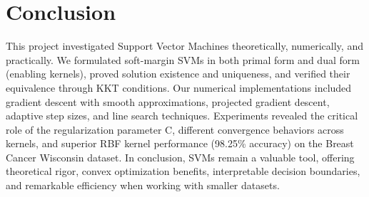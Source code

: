\section{Conclusion}
\label{chap:conclusion}
\vspace{-0.4cm}
This project investigated Support Vector Machines theoretically, numerically, and practically. We formulated soft-margin SVMs in both primal form and dual form (enabling kernels), proved solution existence and uniqueness, and verified their equivalence through KKT conditions. Our numerical implementations included gradient descent with smooth approximations, projected gradient descent, adaptive step sizes, and line search techniques. Experiments revealed the critical role of the regularization parameter C, different convergence behaviors across kernels, and superior RBF kernel performance (98.25\% accuracy) on the Breast Cancer Wisconsin dataset. 
In conclusion, SVMs remain a valuable tool, offering theoretical rigor, convex optimization benefits, interpretable decision boundaries, and remarkable efficiency when working with smaller datasets.